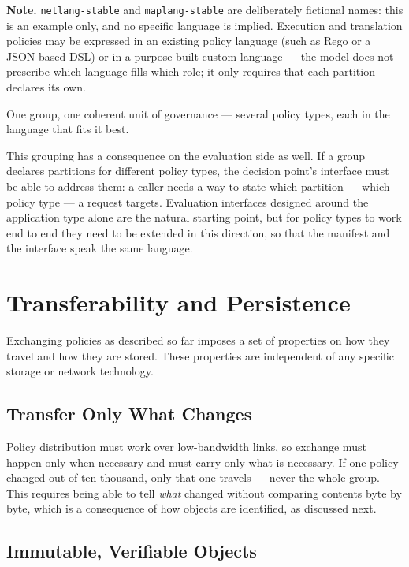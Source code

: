 \documentclass[11pt,a4paper]{article}
\newcommand{\field}[1]{\texttt{#1}}              %
\begin{document}
\noindent\textbf{Note.} \field{netlang-stable} and \field{maplang-stable}
are deliberately fictional names: this is an example only, and no
specific language is implied. Execution and translation policies may be
expressed in an existing policy language (such as Rego or a JSON-based
DSL) or in a purpose-built custom language --- the model does not
prescribe which language fills which role; it only requires that each
partition declares its own.

One group, one coherent unit of governance --- several policy types, each
in the language that fits it best.

This grouping has a consequence on the evaluation side as well. If a
group declares partitions for different policy types, the decision
point's interface must be able to address them: a caller needs a way to
state which partition --- which policy type --- a request targets.
Evaluation interfaces designed around the application type alone are the
natural starting point, but for policy types to work end to end they need
to be extended in this direction, so that the manifest and the interface
speak the same language.

\section{Transferability and Persistence}

Exchanging policies as described so far imposes a set of properties on
how they travel and how they are stored. These properties are independent
of any specific storage or network technology.

\subsection{Transfer Only What Changes}

Policy distribution must work over low-bandwidth links, so exchange must
happen only when necessary and must carry only what is necessary. If one
policy changed out of ten thousand, only that one travels --- never the
whole group. This requires being able to tell \emph{what} changed without
comparing contents byte by byte, which is a consequence of how objects
are identified, as discussed next.

\subsection{Immutable, Verifiable Objects}
\end{document}
